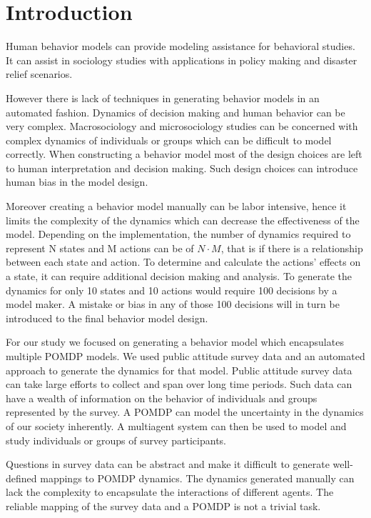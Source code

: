 \section{Introduction}



Human behavior models can provide modeling assistance for behavioral studies. It can assist in sociology studies with applications in policy making and disaster relief scenarios. 

However there is lack of techniques in generating behavior models in an automated fashion. Dynamics of decision making and human behavior can be very complex. Macrosociology and microsociology studies can be concerned with complex dynamics of individuals or groups which can be difficult to model correctly. When constructing a behavior model most of the design choices are left to human interpretation and decision making. Such design choices can introduce human bias in the model design. 

Moreover creating a behavior model manually can be labor intensive, hence it limits the complexity of the dynamics which can decrease the effectiveness of the model. Depending on the implementation, the number of dynamics required to represent N states and M actions can be of $N\cdot M$, that is if there is a relationship between each state and action. To determine and calculate the actions' effects on a state, it can require additional decision making and analysis. To generate the dynamics for only 10 states and 10 actions would require 100 decisions by a model maker. A mistake or bias in any of those 100 decisions will in turn be introduced to the final behavior model design. 

For our study we focused on generating a behavior model which encapsulates multiple POMDP models. We used public attitude survey data and an automated approach to generate the dynamics for that model. Public attitude survey data can take large efforts to collect and span over long time periods. Such data can have a wealth of information on the behavior of individuals and groups represented by the survey. A POMDP can model the uncertainty in the dynamics of our society inherently. A multiagent system can then be used to model and study individuals or groups of survey participants.
 
Questions in survey data can be abstract and make it difficult to generate well-defined mappings to POMDP dynamics. The dynamics generated manually can lack the complexity to encapsulate the interactions of different agents. The reliable mapping of the survey data and a POMDP is not a trivial task.
 
